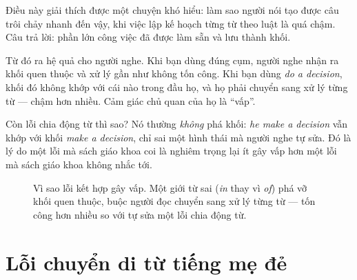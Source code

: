 \documentclass[../../english.tex]{subfiles}
\begin{document}
Điều này giải thích được một chuyện khó hiểu: làm sao người nói tạo được câu trôi chảy nhanh đến vậy, khi việc lập kế hoạch từng từ theo luật là quá chậm. Câu trả lời: phần lớn công việc đã được làm sẵn và lưu thành khối.

Từ đó ra hệ quả cho người nghe. Khi bạn dùng đúng cụm, người nghe nhận ra khối quen thuộc và xử lý gần như không tốn công. Khi bạn dùng \emph{do a decision}, khối đó không khớp với cái nào trong đầu họ, và họ phải chuyển sang xử lý từng từ --- chậm hơn nhiều. Cảm giác chủ quan của họ là ``vấp''.

Còn lỗi chia động từ thì sao? Nó thường \emph{không} phá khối: \emph{he make a decision} vẫn khớp với khối \emph{make a decision}, chỉ sai một hình thái mà người nghe tự sửa. Đó là lý do một lỗi mà sách giáo khoa coi là nghiêm trọng lại ít gây vấp hơn một lỗi mà sách giáo khoa không nhắc tới.

\begin{figure}[H]\centering
{}
\caption{Vì sao lỗi kết hợp gây vấp. Một giới từ sai (\emph{in} thay vì \emph{of}) phá vỡ khối quen thuộc, buộc người đọc chuyển sang xử lý từng từ --- tốn công hơn nhiều so với tự sửa một lỗi chia động từ.}
\label{fig:khoi-cum}
\end{figure}

\section{Lỗi chuyển di từ tiếng mẹ đẻ}
\end{document}
